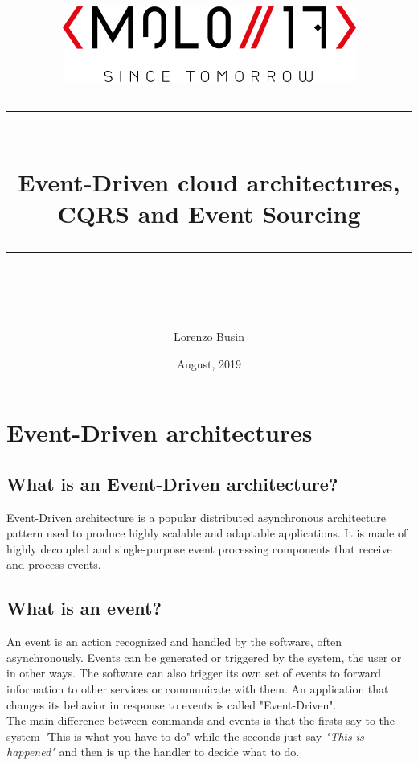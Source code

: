 \documentclass[11pt]{article} %
\title{	
	\normalfont\normalsize
	\includegraphics[width=0.5\columnwidth]{logo-black}
	\vspace{25pt} %
	\rule{\linewidth}{0.5pt}\\ %
	\vspace{20pt} %
	{\huge Event-Driven cloud architectures, CQRS and Event Sourcing}\\ %
	\vspace{12pt} %
	\rule{\linewidth}{2pt}\\ %
	\vspace{12pt} %
}
\author{\LARGE Lorenzo Busin} %
\date{\normalsize August, 2019} %
\begin{document}
\maketitle %


\tableofcontents
\newpage

\section{Event-Driven architectures}  

\subsection{What is an Event-Driven architecture?}
Event-Driven architecture is a popular distributed asynchronous architecture pattern used to produce highly scalable and adaptable applications. It is made of highly decoupled and single-purpose event processing components that receive and process events. 

\subsection{What is an event?}
An event is an action recognized and handled by the software, often asynchronously. Events can be generated or triggered by the system, the user or in other ways. The software can also trigger its own set of events to forward information to other services or communicate with them. An application that changes its behavior in response to events is called "Event-Driven".\\
The main difference between commands and events is that the firsts say to the system \emph"This is what you have to do" while the seconds just say \emph{"This is happened"} and then is up the handler to decide what to do.
\end{document}

